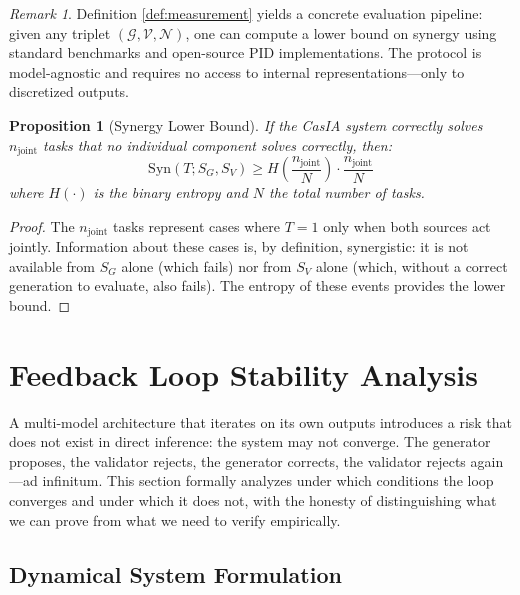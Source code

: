 \documentclass[11pt,a4paper]{article}
\newtheorem{proposition}{Proposition}[section]
\theoremstyle{remark}
\newtheorem{remark}{Remark}[section]
\newcommand{\Syn}{\mathrm{Syn}}
\begin{document}
\begin{remark}
Definition \ref{def:measurement} yields a concrete evaluation pipeline: given any triplet $(\mathcal{G}, \mathcal{V}, \mathcal{N})$, one can compute a lower bound on synergy using standard benchmarks and open-source PID implementations. The protocol is model-agnostic and requires no access to internal representations---only to discretized outputs.
\end{remark}

\begin{proposition}[Synergy Lower Bound]
\label{prop:synergy_bound}
If the CasIA system correctly solves $n_{\text{joint}}$ tasks that no individual component solves correctly, then:
\begin{equation}
  \Syn(T; S_G, S_V) \geq H\left(\frac{n_{\text{joint}}}{N}\right) \cdot \frac{n_{\text{joint}}}{N}
\end{equation}
where $H(\cdot)$ is the binary entropy and $N$ the total number of tasks.
\end{proposition}

\begin{proof}
The $n_{\text{joint}}$ tasks represent cases where $T = 1$ only when both sources act jointly. Information about these cases is, by definition, synergistic: it is not available from $S_G$ alone (which fails) nor from $S_V$ alone (which, without a correct generation to evaluate, also fails). The entropy of these events provides the lower bound.
\end{proof}

\section{Feedback Loop Stability Analysis}
\label{sec:stability}

A multi-model architecture that iterates on its own outputs introduces a risk that does not exist in direct inference: the system may not converge. The generator proposes, the validator rejects, the generator corrects, the validator rejects again---ad infinitum. This section formally analyzes under which conditions the loop converges and under which it does not, with the honesty of distinguishing what we can prove from what we need to verify empirically.

\subsection{Dynamical System Formulation}
\end{document}
